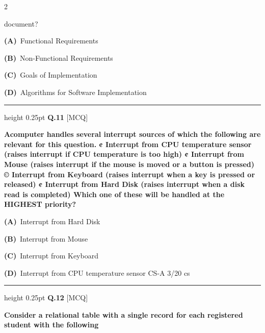 \documentclass[a4paper,10pt,twoside]{article}
\begin{document}
\begin{multicols}{2}
{document? \par}
\par\vspace{2pt}\noindent
\textbf{(A)}~Functional Requirements\par\vspace{2pt}\noindent
\textbf{(B)}~Non-Functional Requirements\par\vspace{2pt}\noindent
\textbf{(C)}~Goals of Implementation\par\vspace{2pt}\noindent
\textbf{(D)}~Algorithms for Software Implementation
\par\vspace{6pt}\hrule height 0.25pt\vspace{6pt}
\noindent\textbf{Q.11} \hfill {\footnotesize\textsf{[MCQ]}}
\par\vspace{2pt}
{\bfseries Acomputer handles several interrupt sources of which the following are relevant for this question.
¢ Interrupt from CPU temperature sensor (raises interrupt if CPU temperature is too high)
¢ Interrupt from Mouse (raises interrupt if the mouse is moved or a button is pressed)
© Interrupt from Keyboard (raises interrupt when a key is pressed or released)
¢ Interrupt from Hard Disk (raises interrupt when a disk read is completed)
Which one of these will be handled at the HIGHEST priority? \par}
\par\vspace{2pt}\noindent
\textbf{(A)}~Interrupt from Hard Disk\par\vspace{2pt}\noindent
\textbf{(B)}~Interrupt from Mouse\par\vspace{2pt}\noindent
\textbf{(C)}~Interrupt from Keyboard\par\vspace{2pt}\noindent
\textbf{(D)}~Interrupt from CPU temperature sensor \newline CS-A 3/20  cs
\par\vspace{6pt}\hrule height 0.25pt\vspace{6pt}
\noindent\textbf{Q.12} \hfill {\footnotesize\textsf{[MCQ]}}
\par\vspace{2pt}
{\bfseries Consider a relational table with a single record for each registered student with the following
}
\end{multicols}
\end{document}
